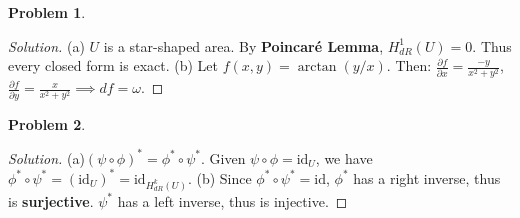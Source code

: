 \documentclass[12pt, a4paper]{article}
\theoremstyle{definition}
\newtheorem{problem}{Problem}
\newenvironment{solution}
  {\renewcommand\qedsymbol{$\blacksquare$}\begin{proof}[Solution]}
  {\end{proof}}
\newcommand{\id}{\text{id}}
\begin{document}
\begin{problem}
\end{problem}

\begin{solution}
(a) $U$ is a star-shaped area. By \textbf{Poincaré Lemma}, $H^1_{dR}(U)=0$. Thus every closed form is exact.
(b) Let $f(x, y) = \arctan(y/x)$. Then:
$\frac{\partial f}{\partial x} = \frac{-y}{x^2+y^2}$, $\frac{\partial f}{\partial y} = \frac{x}{x^2+y^2} \implies df = \omega$.
\end{solution}

\begin{problem}
\end{problem}

\begin{solution}
(a)$(\psi \circ \phi)^* = \phi^* \circ \psi^*$. Given $\psi \circ \phi = \id_U$, we have $\phi^* \circ \psi^* = (\id_U)^* = \id_{H^k_{dR}(U)}$.
(b) Since $\phi^* \circ \psi^* = \id$, $\phi^*$ has a right inverse, thus is \textbf{surjective}. $\psi^*$ has a left inverse, thus is injective.
\end{solution}
\end{document}
